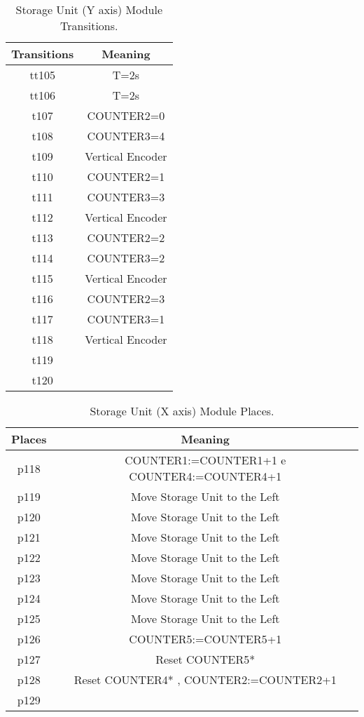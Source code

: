 \begin{table}[htbp]
\caption{Storage Unit (Y axis) Module Transitions.}
\centering
\begin{tabular}{cc}
Transitions & Meaning\\
\hline
tt105 & T=2s\\
tt106 & T=2s\\
t107 & COUNTER2=0\\
t108 & COUNTER3=4\\
t109 & Vertical Encoder\\
t110 & COUNTER2=1\\
t111 & COUNTER3=3\\
t112 & Vertical Encoder\\
t113 & COUNTER2=2\\
t114 & COUNTER3=2\\
t115 & Vertical Encoder\\
t116 & COUNTER2=3\\
t117 & COUNTER3=1\\
t118 & Vertical Encoder\\
t119 & \\
t120 & \\
\end{tabular}
\end{table}
\begin{table}[htbp]
\caption{Storage Unit (X axis) Module Places.}
\centering
\begin{tabular}{cc}
Places & Meaning\\
\hline
p118 & COUNTER1:=COUNTER1+1 e COUNTER4:=COUNTER4+1\\
p119 & Move Storage Unit to the Left\\
p120 & Move Storage Unit to the Left\\
p121 & Move Storage Unit to the Left\\
p122 & Move Storage Unit to the Left\\
p123 & Move Storage Unit to the Left\\
p124 & Move Storage Unit to the Left\\
p125 & Move Storage Unit to the Left\\
p126 & COUNTER5:=COUNTER5+1\\
p127 & Reset COUNTER5*\\
p128 & Reset COUNTER4* , COUNTER2:=COUNTER2+1\\
p129 & \\
\end{tabular}
\end{table}

